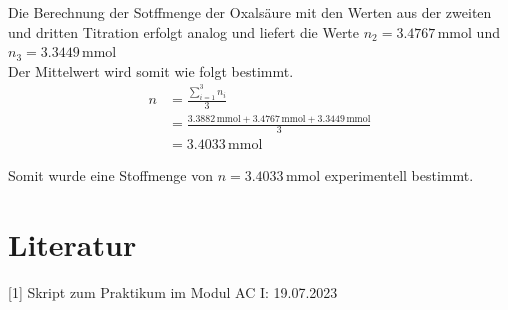 \documentclass[12pt]{scrartcl} %
\begin{document}
Die Berechnung der Sotffmenge der Oxalsäure mit den Werten aus der zweiten und dritten Titration erfolgt analog und liefert die Werte $n_2 = 3.4767\,\mathrm{mmol}$ und $n_3 = 3.3449\,\mathrm{mmol}$\\
Der Mittelwert wird somit wie folgt bestimmt.
\begin{align*}
    n &= \frac{\sum_{i = 1}^{3} n_i}{3}\\
    &= \frac{3.3882\,\mathrm{mmol} + 3.4767\,\mathrm{mmol} + 3.3449\,\mathrm{mmol}}{3}\\
    &= 3.4033\,\mathrm{mmol}
\end{align*}

Somit wurde eine Stoffmenge von $n = 3.4033\,\mathrm{mmol}$ experimentell bestimmt.

\section{Literatur}
[1] Skript zum Praktikum im Modul AC I: 19.07.2023
\end{document}
